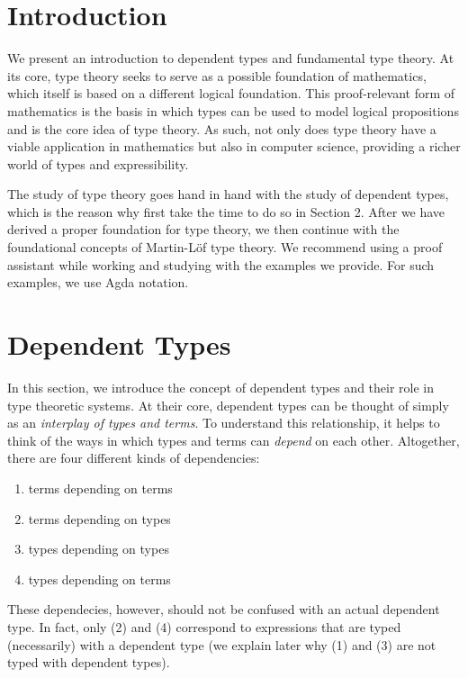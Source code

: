 \documentclass[12pt]{article}
\begin{document}
\maketitle


\section{Introduction}
We present an introduction to dependent types and fundamental type theory.
At its core, type theory seeks to serve as a possible foundation of mathematics,
which itself is based on a different logical foundation. This proof-relevant
form of mathematics is the basis in which types can be used to model logical
propositions and is the core idea of type theory. As such, not only does type
theory have a viable application in mathematics but also in computer science,
providing a richer world of types and expressibility.

The study of type theory goes hand in hand with the study of dependent types,
which is the reason why first take the time to do so in Section 2. After we
have derived a proper foundation for type theory, we then continue with the
foundational concepts of Martin-L\"of type theory. We recommend using a proof
assistant while working and studying with the examples we provide. For such
examples, we use Agda notation.


\section{Dependent Types}
In this section, we introduce the concept of dependent types and their role in
type theoretic systems. At their core, dependent types can be thought of simply
as an \textit{interplay of types and terms}. To understand this relationship,
it helps to think of the ways in which types and terms can \textit{depend} on
each other. Altogether, there are four different kinds of dependencies:

\begin{enumerate}
\item terms depending on terms
\item terms depending on types
\item types depending on types
\item types depending on terms
\end{enumerate}
These dependecies, however, should not be confused with an actual dependent
type. In fact, only (2) and (4) correspond to expressions that are typed
(necessarily) with a dependent type (we explain later why (1) and (3) are
not typed with dependent types).
\end{document}
